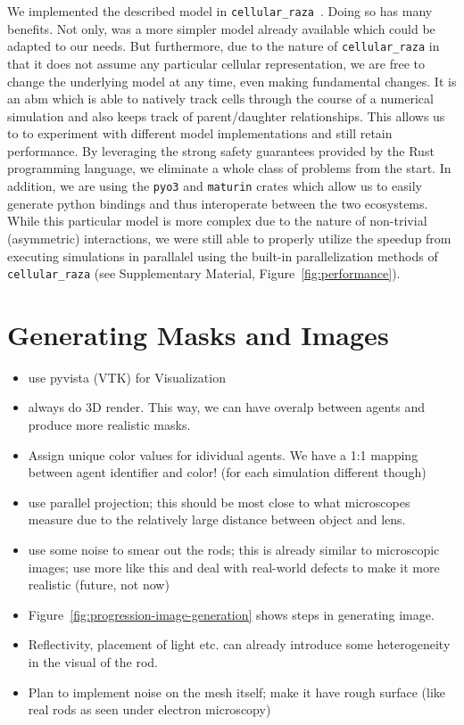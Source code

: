 \documentclass{article}
\begin{document}
We implemented the described model in \texttt{cellular\_raza}~\cite{Pleyer2025}.
Doing so has many benefits.
Not only, was a more simpler model already available which could be adapted to our needs.
But furthermore, due to the nature of \texttt{cellular\_raza} in that it does not assume any
particular cellular representation, we are free to change the underlying model at any time, even
making fundamental changes.
It is an \ac{abm} which is able to natively track cells through the course of a numerical simulation
and also keeps track of parent/daughter relationships.
This allows us to to experiment with different model implementations and still retain performance.
By leveraging the strong safety guarantees provided by the Rust programming language, we eliminate a
whole class of problems from the start.
In addition, we are using the \texttt{pyo3} and \texttt{maturin} crates which allow us to easily
generate python bindings and thus interoperate between the two ecosystems.
While this particular model is more complex due to the nature of non-trivial (asymmetric)
interactions, we were still able to properly utilize the speedup from executing simulations in
parallalel using the built-in parallelization methods of \texttt{cellular\_raza} (see
Supplementary Material, Figure~\ref{fig:performance}).

\section{Generating Masks and Images}
\label{section:generating-masks-and-images}
\begin{itemize}
    \item use pyvista (VTK) for Visualization
    \item always do 3D render. This way, we can have overalp between agents and produce more
        realistic masks.
    \item Assign unique color values for idividual agents.
        We have a 1:1 mapping between agent identifier and color! (for each simulation different
        though)
    \item use parallel projection; this should be most close to what microscopes measure due to the
        relatively large distance between object and lens.
    \item use some noise to smear out the rods; this is already similar to microscopic images; use
        more like this and deal with real-world defects to make it more realistic (future, not now)
    \item Figure~\ref{fig:progression-image-generation} shows steps in generating image.
    \item Reflectivity, placement of light etc. can already introduce some heterogeneity in the
        visual of the rod.
    \item Plan to implement noise on the mesh itself; make it have rough surface (like real rods as
        seen under electron microscopy)
\end{itemize}
\end{document}
